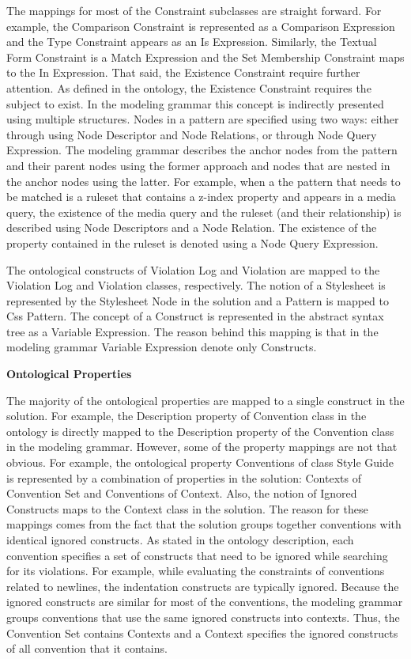 \documentclass[parskip=full]{uvamscse}
\begin{document}
The mappings for most of the Constraint subclasses are straight forward. For example, the Comparison
Constraint is represented as a Comparison Expression and the Type Constraint appears as an Is
Expression. Similarly, the Textual Form Constraint is a Match Expression and the Set Membership
Constraint maps to the In Expression. That said, the Existence Constraint require further attention.
As defined in the ontology, the Existence Constraint requires the subject to exist. In the modeling
grammar this concept is indirectly presented using multiple structures. Nodes in a pattern are
specified using two ways: either through using Node Descriptor and Node Relations, or through Node
Query Expression. The modeling grammar describes the anchor nodes from the pattern and their parent
nodes using the former approach and nodes that are nested in the anchor nodes using the latter. For
example, when a the pattern that needs to be matched is a ruleset that contains a z-index property
and appears in a media query, the existence of the media query and the ruleset (and their
relationship) is described using Node Descriptors and a Node Relation. The existence of the property
contained in the ruleset is denoted using a Node Query Expression.

The ontological constructs of Violation Log and Violation are mapped to the Violation Log and
Violation classes, respectively. The notion of a Stylesheet is represented by the Stylesheet Node in
the solution and a Pattern is mapped to Css Pattern. The concept of a Construct is represented in
the abstract syntax tree as a Variable Expression. The reason behind this mapping is that in the
modeling grammar Variable Expression denote only Constructs.

\textbf{Ontological Properties}

The majority of the ontological properties are mapped to a single construct in the solution. For
example, the Description property of Convention class in the ontology is directly mapped to the
Description property of the Convention class in the modeling grammar. However, some of the property
mappings are not that obvious. For example, the ontological property Conventions of class Style
Guide is represented by a combination of properties in the solution: Contexts of Convention Set and
Conventions of Context. Also, the notion of Ignored Constructs maps to the Context class in the
solution. The reason for these mappings comes from the fact that the solution groups together
conventions with identical ignored constructs. As stated in the ontology description, each
convention specifies a set of constructs that need to be ignored while searching for its violations.
For example, while evaluating the constraints of conventions related to newlines, the indentation
constructs are typically ignored. Because the ignored constructs are similar for most of the
conventions, the modeling grammar groups conventions that use the same ignored constructs into
contexts. Thus, the Convention Set contains Contexts and a Context specifies the ignored constructs
of all convention that it contains.
\end{document}

